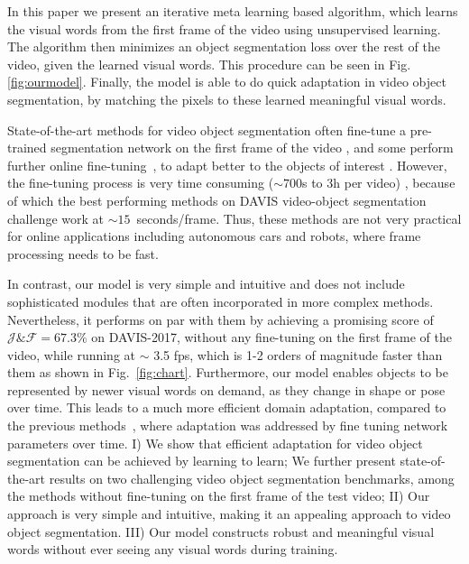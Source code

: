 \documentclass[10pt,twocolumn,letterpaper]{article}
\begin{document}
In this paper we present an iterative meta learning based algorithm, which learns the visual words from the first frame of the video using unsupervised learning. The algorithm then minimizes an object segmentation loss over the rest of the video, given the learned visual words.
This procedure can be seen in Fig. \ref{fig:ourmodel}.
Finally, the model is able to do quick adaptation in video object segmentation, by matching the pixels to these learned meaningful visual words.


State-of-the-art methods for video object segmentation often fine-tune a pre-trained segmentation network on the first frame of the video \cite{OSVOS,onavos,masktrack,Bao_2018_CVPR,Li_2018_ECCV}, and some perform further online fine-tuning~\cite{onavos}, to adapt better to the objects of interest .
However, the fine-tuning process is very time consuming ($\sim 700$s to $3$h per video) \cite{OSVOS,lucid}, because of which the best performing methods on DAVIS video-object segmentation challenge \cite{davis_2017, Caelles_arXiv_2018} work at $\sim 15$~seconds/frame.
Thus, these methods are not very practical for online applications including autonomous cars and robots, where frame processing needs to be fast.


In contrast, our model is very simple and intuitive and does not include sophisticated modules that are often incorporated in more complex methods. Nevertheless, it performs on par with them by achieving a promising score of $\mathcal{J}\&\mathcal{F}=67.3\%$ on DAVIS-2017, without any fine-tuning on the first frame of the video, while running at $\sim$ 3.5 fps, which is 1-2 orders of magnitude faster than them as shown in Fig.~\ref{fig:chart}. 
Furthermore, our model enables objects to be represented by newer visual words on demand, as they change in shape or pose over time. This leads to a much more efficient domain adaptation, compared to the previous methods~\cite{onavos}, where adaptation was addressed by fine tuning network parameters over time.
I) We show that efficient adaptation for video object segmentation can be achieved by learning to learn;
 We further present state-of-the-art results on two challenging video object segmentation benchmarks, among the methods without fine-tuning on the first frame of the test video;
II) Our approach is very simple and intuitive, making it an appealing approach to video object segmentation.
III) Our model constructs robust and meaningful visual words without ever seeing any visual words during training.
\end{document}
